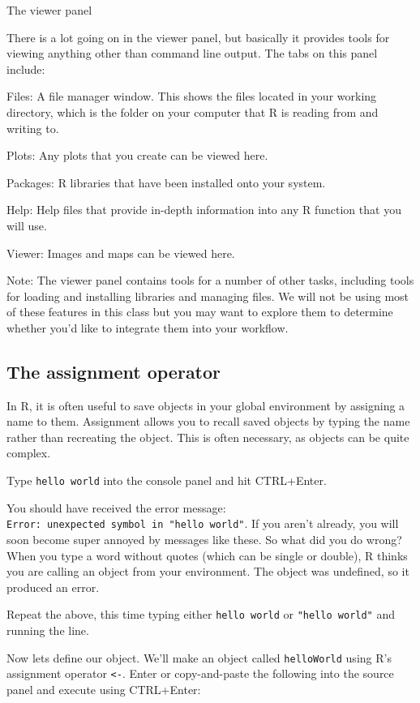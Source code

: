 \documentclass[]{article}
\begin{document}
The viewer panel

There is a lot going on in the viewer panel, but basically it provides
tools for viewing anything other than command line output. The tabs on
this panel include:

Files: A file manager window. This shows the files located in your
working directory, which is the folder on your computer that R is
reading from and writing to.

Plots: Any plots that you create can be viewed here.

Packages: R libraries that have been installed onto your system.

Help: Help files that provide in-depth information into any R function
that you will use.

Viewer: Images and maps can be viewed here.

Note: The viewer panel contains tools for a number of other tasks,
including tools for loading and installing libraries and managing files.
We will not be using most of these features in this class but you may
want to explore them to determine whether you'd like to integrate them
into your workflow.

\subsection{The assignment operator}\label{the-assignment-operator}

In R, it is often useful to save objects in your global environment by
assigning a name to them. Assignment allows you to recall saved objects
by typing the name rather than recreating the object. This is often
necessary, as objects can be quite complex.

 Type \texttt{hello\ world} into the console panel and hit CTRL+Enter.

You should have received the error message:
\texttt{Error:\ unexpected\ symbol\ in\ "hello\ world"}. If you aren't
already, you will soon become super annoyed by messages like these. So
what did you do wrong? When you type a word without quotes (which can be
single or double), R thinks you are calling an object from your
environment. The object was undefined, so it produced an error.

 Repeat the above, this time typing either
\texttt{\textquotesingle{}hello\ world\textquotesingle{}} or
\texttt{"hello\ world"} and running the line.

 Now lets define our object. We'll make an object called
\texttt{helloWorld} using R's assignment operator \texttt{\textless{}-}.
Enter or copy-and-paste the following into the source panel and execute
using CTRL+Enter:
\end{document}
